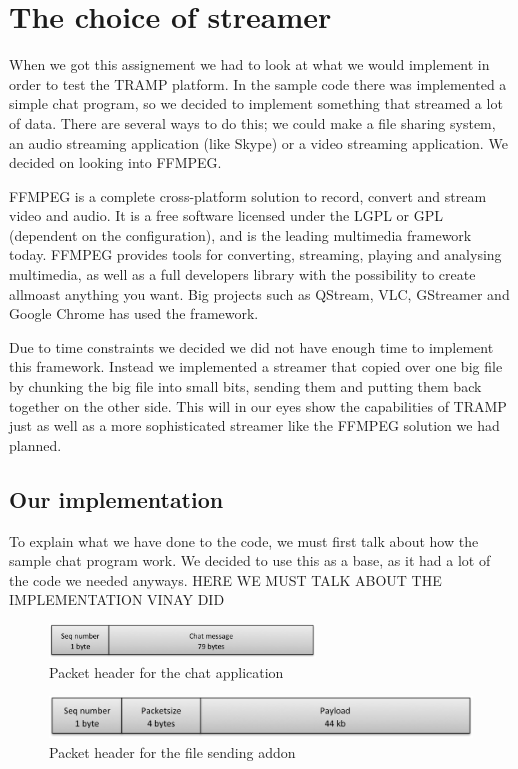 
\section{The choice of streamer}
\label{sec:streamer}
When we got this assignement we had to look at what we would implement in order to test the TRAMP platform. In the sample code there was implemented a simple chat program, so we decided to implement something that streamed a lot of data. There are several ways to do this; we could make a file sharing system, an audio streaming application (like Skype) or a video streaming application. We decided on looking into FFMPEG.

FFMPEG is a complete cross-platform solution to record, convert and stream video and audio. It is a free software licensed under the LGPL or GPL (dependent on the configuration), and is the leading multimedia framework today.\cite{FFMPEG-homepage}
FFMPEG provides tools for converting, streaming, playing and analysing multimedia, as well as a full developers library with the possibility to create allmoast anything you want. Big projects such as QStream, VLC, GStreamer and Google Chrome has used the framework.

Due to time constraints we decided we did not have enough time to implement this framework. Instead we implemented a streamer that copied over one big file by chunking the big file into small bits, sending them and putting them back together on the other side. This will in our eyes show the capabilities of TRAMP just as well as a more sophisticated streamer like the FFMPEG solution we had planned.

\subsection{Our implementation}
To explain what we have done to the code, we must first talk about how the sample chat program work. We decided to use this as a base, as it had a lot of the code we needed anyways. HERE WE MUST TALK ABOUT THE IMPLEMENTATION VINAY DID

\begin{figure}[h]
\centering
 \includegraphics[width=200pt]{sendchatpkt.png}
\caption{Packet header for the chat application}
\label{Figure:Packet_header_chat}
\end{figure}

\begin{center}
\begin{figure}
\centering
 \includegraphics[width=400pt]{sendpkt.png}
\caption{Packet header for the file sending addon}
\end{figure}
\end{center}
